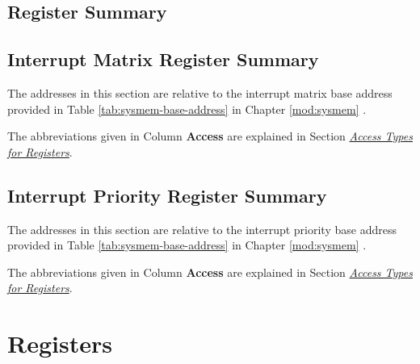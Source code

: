 \documentclass[main\_\_EN.tex]{subfiles}
\begin{document}


\clearpage
\hypertarget{intmtrx-reg-summ}{}
\begin{landscape}
\section{Register Summary}

\subsection{Interrupt Matrix Register Summary}
\label{sec:intmtrx-reg-summ}
The addresses in this section are relative to the interrupt matrix base address provided in Table \ref{tab:sysmem-base-address} in Chapter \ref{mod:sysmem} \textit{}.

The abbreviations given in Column \textbf{Access} are explained in Section \hyperref[glossary-access-types]{\textit{Access Types for Registers}}.



\subsection{Interrupt Priority Register Summary}
\label{sec:intpri-reg-summ}
The addresses in this section are relative to the interrupt priority base address provided in Table \ref{tab:sysmem-base-address} in Chapter \ref{mod:sysmem} \textit{}.

The abbreviations given in Column \textbf{Access} are explained in Section \hyperref[glossary-access-types]{\textit{Access Types for Registers}}.



\end{landscape}



\clearpage
\section{Registers}
\end{document}

